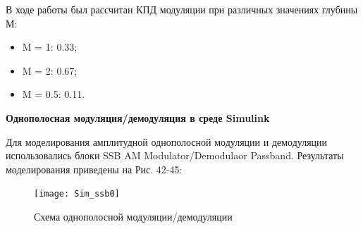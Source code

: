 \documentclass[10pt,a4paper]{article}
\begin{document}
\FloatBarrier

В ходе работы был рассчитан КПД модуляции при различных значениях глубины М:

\begin{itemize}
	\item M = 1:		0.33;
	\item M = 2:		0.67;
	\item M = 0.5:		0.11.
\end{itemize}

\textbf{Однополосная модуляция/демодуляция в среде Simulink}

Для моделирования амплитудной однополосной модуляции и демодуляции использовались блоки SSB AM Modulator/Demodulaor Passband. Результаты моделирования приведены на Рис. 42-45:

\begin{figure}[h]\centering
	\texttt{[image: Sim\_ssb0]}
	\caption{Схема однополосной модуляции/демодуляции}\label{fig.Sim_ssb0}
\end{figure}                                                                                                                                                                                                                                                                                                                                                                                                                                                                                                                                                                                                                                                                                                                                                                                                                                                                                                                                                                                                                                                                                                                                                                                                                                                                                                                                                                                                                                                                        
\end{document}
